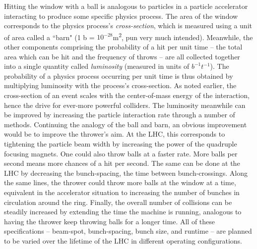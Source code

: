     Hitting the window with a ball is analogous to particles in a particle accelerator interacting to produce some specific physics process.
    The area of the window corresponds to the physics process's \textit{cross-section}, which is measured using a unit of area called a ``barn" (1 b = $10^{-28}$m\textsuperscript{2}, pun very much intended).
    Meanwhile, the other components comprising the probability of a hit per unit time
        -- the total area which can be hit and the frequency of throws --
        are all collected together into a single quantity called \textit{luminosity} (measured in units of $b^{-1}t^{-1}$). 
    The probability of a physics process occurring per unit time is thus obtained by multiplying luminosity with the process's cross-section.
    As noted earlier, the cross-section of an event scales with the center-of-mass energy of the interaction, hence the drive for ever-more powerful colliders.
    The luminosity meanwhile can be improved by increasing the particle interaction rate through a number of methods.
    Continuing the analogy of the ball and barn, an obvious improvement would be to improve the thrower's aim.
    At the LHC, this corresponds to tightening the particle beam width by increasing the power of the quadruple focusing magnets.
    One could also throw balls at a faster rate.
    More balls per second means more chances of a hit per second.
    The same can be done at the LHC by decreasing the bunch-spacing, the time between bunch-crossings.
    Along the same lines, the thrower could throw more balls at the window at a time, equivalent in the accelerator situation to increasing the number of bunches in circulation around the ring.
    Finally, the overall number of collisions can be steadily increased by extending the time the machine is running, analogous to having the thrower keep throwing balls for a longer time.
    All of these specifications -- beam-spot, bunch-spacing, bunch size, and runtime -- are planned to be varied over the lifetime of the LHC in different operating configurations.

    

